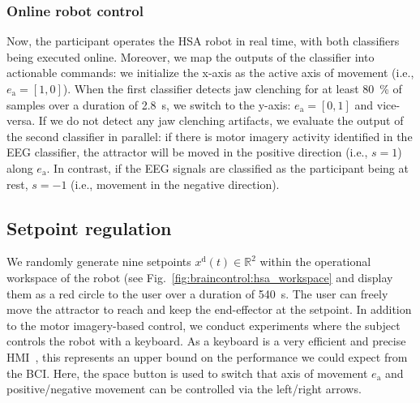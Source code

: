 \subsubsection{Online robot control}
Now, the participant operates the HSA robot in real time, with both classifiers being executed online.
Moreover, we map the outputs of the classifier into actionable commands: we initialize the x-axis as the active axis of movement (i.e., $e_\mathrm{a} = [1,0]$). When the first classifier detects jaw clenching for at least \SI{80}{\percent} of samples over a duration of \SI{2.8}{s}, we switch to the y-axis: $e_\mathrm{a} = [0,1]$ and vice-versa. If we do not detect any jaw clenching artifacts, we evaluate the output of the second classifier in parallel: if there is motor imagery activity identified in the \gls{EEG} classifier, the attractor will be moved in the positive direction (i.e., $s=1$) along $e_\mathrm{a}$. In contrast, if the \gls{EEG} signals are classified as the participant being at rest, $s=-1$ (i.e., movement in the negative direction).


\subsection{Setpoint regulation}\label{sub:braincontrol:experiments:setpoint_regulation}
We randomly generate nine setpoints $x^\mathrm{d}(t) \in \mathbb{R}^2$ within the operational workspace of the robot (see Fig.~\ref{fig:braincontrol:hsa_workspace} and display them as a red circle to the user over a duration of \SI{540}{s}.
The user can freely move the attractor to reach and keep the end-effector at the setpoint.
In addition to the motor imagery-based control, we conduct experiments where the subject controls the robot with a keyboard.
As a keyboard is a very efficient and precise \gls{HMI}~\citep{vasiljevic2016case, mahmud2020interface}, this represents an upper bound on the performance we could expect from the \gls{BCI}.
Here, the space button is used to switch that axis of movement $e_\mathrm{a}$ and positive/negative movement can be controlled via the left/right arrows.

